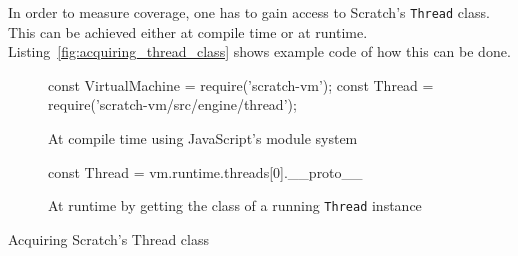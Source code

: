 In order to measure coverage, one has to gain access to Scratch's \texttt{Thread} class.
This can be achieved either at compile time or at runtime.
Listing~\ref{fig:acquiring_thread_class} shows example code of how this can be done.
\parspace

\begin{listing}[htpb]
    \centering

    \begin{subfigure}[b]{.7\textwidth}
        \begin{javascriptcode}
            const VirtualMachine = require('scratch-vm');
            const Thread = require('scratch-vm/src/engine/thread');
        \end{javascriptcode}
        \vspace{-\bigskipamount}
        \caption{At compile time using JavaScript's module system}
    \end{subfigure}

    \bigskip

    \begin{subfigure}[b]{.7\textwidth}
        \begin{javascriptcode}
            const Thread = vm.runtime.threads[0].__proto__
        \end{javascriptcode}
        \vspace{-\bigskipamount}
        \caption{At runtime by getting the class of a running \texttt{Thread} instance}
    \end{subfigure}

    \caption{Acquiring Scratch's Thread class}
    \label{fig:acquiring_thread_class}
\end{listing}

